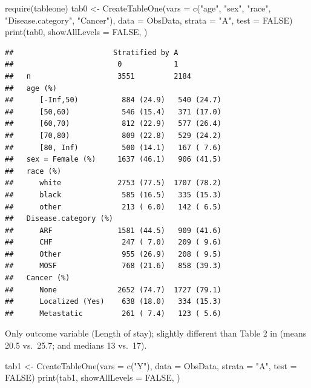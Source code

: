 \documentclass[
]{book}
\newenvironment{Shaded}{\begin{snugshade}}{\end{snugshade}}
\newcommand{\AttributeTok}[1]{\textcolor[rgb]{0.77,0.63,0.00}{#1}}
\newcommand{\ConstantTok}[1]{\textcolor[rgb]{0.00,0.00,0.00}{#1}}
\newcommand{\FunctionTok}[1]{\textcolor[rgb]{0.00,0.00,0.00}{#1}}
\newcommand{\NormalTok}[1]{#1}
\newcommand{\OtherTok}[1]{\textcolor[rgb]{0.56,0.35,0.01}{#1}}
\newcommand{\StringTok}[1]{\textcolor[rgb]{0.31,0.60,0.02}{#1}}
\begin{document}
\begin{Shaded}
\begin{Highlighting}[]
\FunctionTok{require}\NormalTok{(tableone)}
\NormalTok{tab0 }\OtherTok{\textless{}{-}} \FunctionTok{CreateTableOne}\NormalTok{(}\AttributeTok{vars =} \FunctionTok{c}\NormalTok{(}\StringTok{"age"}\NormalTok{, }\StringTok{"sex"}\NormalTok{, }\StringTok{"race"}\NormalTok{, }\StringTok{"Disease.category"}\NormalTok{, }\StringTok{"Cancer"}\NormalTok{),}
                       \AttributeTok{data =}\NormalTok{ ObsData, }
                       \AttributeTok{strata =} \StringTok{"A"}\NormalTok{, }
                       \AttributeTok{test =} \ConstantTok{FALSE}\NormalTok{)}
\FunctionTok{print}\NormalTok{(tab0, }\AttributeTok{showAllLevels =} \ConstantTok{FALSE}\NormalTok{, )}
\end{Highlighting}
\end{Shaded}

\begin{verbatim}
##                       Stratified by A
##                        0            1           
##   n                    3551         2184        
##   age (%)                                       
##      [-Inf,50)          884 (24.9)   540 (24.7) 
##      [50,60)            546 (15.4)   371 (17.0) 
##      [60,70)            812 (22.9)   577 (26.4) 
##      [70,80)            809 (22.8)   529 (24.2) 
##      [80, Inf)          500 (14.1)   167 ( 7.6) 
##   sex = Female (%)     1637 (46.1)   906 (41.5) 
##   race (%)                                      
##      white             2753 (77.5)  1707 (78.2) 
##      black              585 (16.5)   335 (15.3) 
##      other              213 ( 6.0)   142 ( 6.5) 
##   Disease.category (%)                          
##      ARF               1581 (44.5)   909 (41.6) 
##      CHF                247 ( 7.0)   209 ( 9.6) 
##      Other              955 (26.9)   208 ( 9.5) 
##      MOSF               768 (21.6)   858 (39.3) 
##   Cancer (%)                                    
##      None              2652 (74.7)  1727 (79.1) 
##      Localized (Yes)    638 (18.0)   334 (15.3) 
##      Metastatic         261 ( 7.4)   123 ( 5.6)
\end{verbatim}

Only outcome variable (Length of stay); slightly different than Table 2 in \citet{connors1996effectiveness} (means 20.5 vs.~25.7; and medians 13 vs.~17).

\begin{Shaded}
\begin{Highlighting}[]
\NormalTok{tab1 }\OtherTok{\textless{}{-}} \FunctionTok{CreateTableOne}\NormalTok{(}\AttributeTok{vars =} \FunctionTok{c}\NormalTok{(}\StringTok{"Y"}\NormalTok{),}
                       \AttributeTok{data =}\NormalTok{ ObsData, }
                       \AttributeTok{strata =} \StringTok{"A"}\NormalTok{, }
                       \AttributeTok{test =} \ConstantTok{FALSE}\NormalTok{)}
\FunctionTok{print}\NormalTok{(tab1, }\AttributeTok{showAllLevels =} \ConstantTok{FALSE}\NormalTok{, )}
\end{Highlighting}
\end{Shaded}
\end{document}
